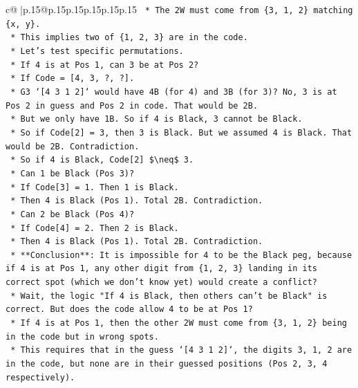 \documentclass{article}
\begin{document}
{\begin{supertabular}{c@{$\;$}|p{.15\linewidth}@{}p{.15\linewidth}p{.15\linewidth}p{.15\linewidth}p{.15\linewidth}p{.15\linewidth}}
{{{\texttt{            *   The 2W must come from \{3, 1, 2\} matching \{x, y\}.} \\
\texttt{            *   This implies two of \{1, 2, 3\} are in the code.} \\
\texttt{            *   Let's test specific permutations.} \\
\texttt{            *   If 4 is at Pos 1, can 3 be at Pos 2?} \\
\texttt{                *   If Code = {[}4, 3, ?, ?{]}.} \\
\texttt{                *   G3 `{[}4 3 1 2{]}` would have 4B (for 4) and 3B (for 3)? No, 3 is at Pos 2 in guess and Pos 2 in code. That would be 2B.} \\
\texttt{                *   But we only have 1B. So if 4 is Black, 3 cannot be Black.} \\
\texttt{                *   So if Code{[}2{]} = 3, then 3 is Black. But we assumed 4 is Black. That would be 2B. Contradiction.} \\
\texttt{                *   So if 4 is Black, Code{[}2{]} \$\textbackslash{}neq\$ 3.} \\
\texttt{            *   Can 1 be Black (Pos 3)?} \\
\texttt{                *   If Code{[}3{]} = 1. Then 1 is Black.} \\
\texttt{                *   Then 4 is Black (Pos 1). Total 2B. Contradiction.} \\
\texttt{            *   Can 2 be Black (Pos 4)?} \\
\texttt{                *   If Code{[}4{]} = 2. Then 2 is Black.} \\
\texttt{                *   Then 4 is Black (Pos 1). Total 2B. Contradiction.} \\
\texttt{            *   **Conclusion**: It is impossible for 4 to be the Black peg, because if 4 is at Pos 1, any other digit from \{1, 2, 3\} landing in its correct spot (which we don't know yet) would create a conflict?} \\
\texttt{            *   Wait, the logic "If 4 is Black, then others can't be Black" is correct. But does the code allow 4 to be at Pos 1?} \\
\texttt{            *   If 4 is at Pos 1, then the other 2W must come from \{3, 1, 2\} being in the code but in wrong spots.} \\
\texttt{            *   This requires that in the guess `{[}4 3 1 2{]}`, the digits 3, 1, 2 are in the code, but none are in their guessed positions (Pos 2, 3, 4 respectively).} \\
}}}
\end{supertabular}}
\end{document}
